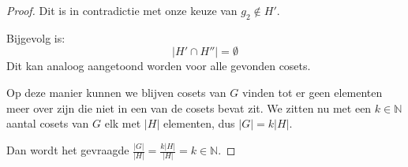 \begin{proof}
    Dit is in contradictie met onze keuze van \(g_2 \notin H'\).

    Bijgevolg is:
    \[
    |H' \cap H''| = \emptyset
    \]
    Dit kan analoog aangetoond worden voor alle gevonden cosets.

    Op deze manier kunnen we blijven cosets van \(G\) vinden tot er geen elementen meer over zijn die niet in een van de cosets bevat zit. We zitten nu met een \(k \in \mathbb{N}\) aantal cosets van \(G\)
    elk met \(|H|\) elementen, dus \(|G| = k|H|\).

    Dan wordt het gevraagde \(\frac{|G|}{|H|} = \frac{k |H| }{|H|} = k \in \mathbb{N}\).


\end{proof}

